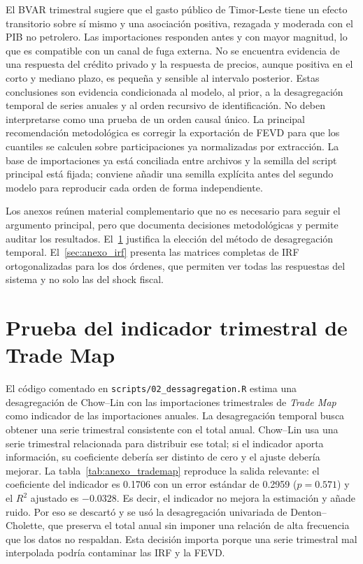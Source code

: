 \documentclass[11pt,a4paper]{article}
\begin{document}
El BVAR trimestral sugiere que el gasto público de Timor-Leste tiene un
efecto transitorio sobre sí mismo y una asociación positiva, rezagada y
moderada con el PIB no petrolero. Las importaciones responden antes y con mayor
magnitud, lo que es compatible con un canal de fuga externa. No se encuentra
evidencia de una respuesta del crédito privado y la respuesta de precios,
aunque positiva en el corto y mediano plazo, es pequeña y sensible al
intervalo posterior. Estas conclusiones son evidencia condicionada al modelo,
al prior, a la desagregación temporal de series anuales y al orden recursivo
de identificación. No deben interpretarse como una prueba de un orden causal
único. La
principal recomendación metodológica es corregir la exportación de
FEVD para que los cuantiles se calculen sobre participaciones ya normalizadas por
extracción. La base de importaciones ya está conciliada entre archivos y
la semilla del script principal está fijada; conviene añadir una semilla
explícita antes del segundo modelo para reproducir cada orden de forma
independiente.

\printbibliography[title={Referencias}]


\appendix
\renewcommand{\thesection}{Anexo \Alph{section}}

Los anexos reúnen material complementario que no es necesario para seguir el
argumento principal, pero que documenta decisiones metodológicas y permite
auditar los resultados. El~\ref{sec:anexo_trademap} justifica la elección
del método de desagregación temporal. El~\ref{sec:anexo_irf} presenta las
matrices completas de IRF ortogonalizadas para los dos órdenes, que permiten ver
todas las respuestas del sistema y no solo las del shock fiscal.

\section{Prueba del indicador trimestral de Trade Map}
\label{sec:anexo_trademap}

El código comentado en \texttt{scripts/02\_dessagregation.R} estima una
desagregación de Chow--Lin con las importaciones trimestrales de \emph{Trade Map}
como indicador de las importaciones anuales. La desagregación temporal busca
obtener una serie trimestral consistente con el total anual. Chow--Lin usa una
serie trimestral relacionada para distribuir ese total; si el indicador aporta
información, su coeficiente debería ser distinto de cero y el ajuste debería
mejorar. La tabla~\ref{tab:anexo_trademap} reproduce la salida relevante: el
coeficiente del indicador es 0.1706 con un error estándar de 0.2959
($p=0.571$) y el $R^2$ ajustado es $-0.0328$. Es decir, el indicador no mejora
la estimación y añade ruido. Por eso se descartó y se usó la desagregación
univariada de Denton--Cholette, que preserva el total anual sin imponer una
relación de alta frecuencia que los datos no respaldan. Esta decisión importa
porque una serie trimestral mal interpolada podría contaminar las IRF y la
FEVD.
\end{document}
